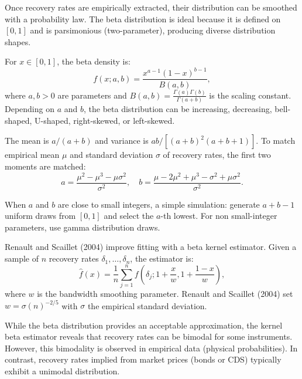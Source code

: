 \documentclass[12pt,a4paper]{article}
\begin{document}
Once recovery rates are empirically extracted, their distribution can be smoothed with a probability law. The beta distribution is ideal because it is defined on $[0,1]$ and is parsimonious (two-parameter), producing diverse distribution shapes.

For $x \in [0,1]$, the beta density is:
$$f(x;a,b) = \frac{x^{a-1}(1-x)^{b-1}}{B(a,b)},$$
where $a, b > 0$ are parameters and $B(a,b) = \frac{\Gamma(a)\Gamma(b)}{\Gamma(a+b)}$ is the scaling constant. Depending on $a$ and $b$, the beta distribution can be increasing, decreasing, bell-shaped, U-shaped, right-skewed, or left-skewed.

The mean is $a/(a+b)$ and variance is $ab/[(a+b)^2(a+b+1)]$. To match empirical mean $\mu$ and standard deviation $\sigma$ of recovery rates, the first two moments are matched:
$$a = \frac{\mu^2 - \mu^3 - \mu\sigma^2}{\sigma^2}, \quad b = \frac{\mu - 2\mu^2 + \mu^3 - \sigma^2 + \mu\sigma^2}{\sigma^2}.$$

When $a$ and $b$ are close to small integers, a simple simulation: generate $a+b-1$ uniform draws from $[0,1]$ and select the $a$-th lowest. For non small-integer parameters, use gamma distribution draws.

Renault and Scaillet (2004) improve fitting with a beta kernel estimator. Given a sample of $n$ recovery rates $\delta_1, \ldots, \delta_n$, the estimator is:
$$\hat{f}(x) = \frac{1}{n}\sum_{j=1}^n f\left(\delta_j; 1 + \frac{x}{w}, 1 + \frac{1-x}{w}\right),$$
where $w$ is the bandwidth smoothing parameter. Renault and Scaillet (2004) set $w = \sigma(n)^{-2/5}$ with $\sigma$ the empirical standard deviation.

While the beta distribution provides an acceptable approximation, the kernel beta estimator reveals that recovery rates can be bimodal for some instruments. However, this bimodality is observed in empirical data (physical probabilities). In contrast, recovery rates implied from market prices (bonds or CDS) typically exhibit a unimodal distribution.
\end{document}
